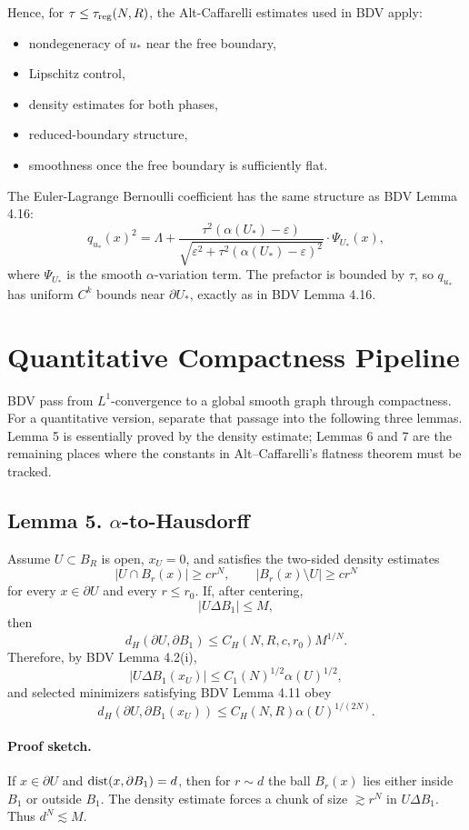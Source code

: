 \documentclass[11pt]{article}
\begin{document}
Hence, for \(\tau\le\tau_{\rm reg}(N,R)\), the Alt-Caffarelli estimates used in BDV
apply:
\begin{itemize}
\item nondegeneracy of \(u_*\) near the free boundary,
\item Lipschitz control,
\item density estimates for both phases,
\item reduced-boundary structure,
\item smoothness once the free boundary is sufficiently flat.
\end{itemize}

The Euler-Lagrange Bernoulli coefficient has the same structure as BDV Lemma
4.16:
\[
q_{u_*}(x)^2
=
\Lambda
+
\frac{\tau^2(\alpha(U_*)-\varepsilon)}
{\sqrt{\varepsilon^2+\tau^2(\alpha(U_*)-\varepsilon)^2}}
\cdot
\Psi_{U_*}(x),
\]
where \(\Psi_{U_*}\) is the smooth \(\alpha\)-variation term. The prefactor is
bounded by \(\tau\), so \(q_{u_*}\) has uniform \(C^k\) bounds near
\(\partial U_*\), exactly as in BDV Lemma 4.16.

\section{Quantitative Compactness Pipeline}

BDV pass from \(L^1\)-convergence to a global smooth graph through compactness.
For a quantitative version, separate that passage into the following three
lemmas. Lemma 5 is essentially proved by the density estimate; Lemmas 6 and 7
are the remaining places where the constants in Alt--Caffarelli's flatness
theorem must be tracked.

\subsection*{Lemma 5. \(\alpha\)-to-Hausdorff}

Assume \(U\subset B_R\) is open, \(x_U=0\), and satisfies the two-sided density
estimates
\[
|U\cap B_r(x)|\ge c r^N,\qquad
|B_r(x)\setminus U|\ge c r^N
\]
for every \(x\in\partial U\) and every \(r\le r_0\). If, after centering,
\[
|U\Delta B_1|\le M,
\]
then
\[
d_H(\partial U,\partial B_1)
\le
C_H(N,R,c,r_0) M^{1/N}.
\]
Therefore, by BDV Lemma 4.2(i),
\[
|U\Delta B_1(x_U)|
\le
C_1(N)^{1/2}\alpha(U)^{1/2},
\]
and selected minimizers satisfying BDV Lemma 4.11 obey
\[
d_H(\partial U,\partial B_1(x_U))
\le
C_H(N,R)\alpha(U)^{1/(2N)}.
\]

\paragraph{Proof sketch.}
If \(x\in\partial U\) and \({\rm dist}(x,\partial B_1)=d\), then for
\(r\sim d\) the ball \(B_r(x)\) lies either inside \(B_1\) or outside \(B_1\).
The density estimate forces a chunk of size \(\gtrsim r^N\) in
\(U\Delta B_1\). Thus \(d^N\lesssim M\).
\end{document}
